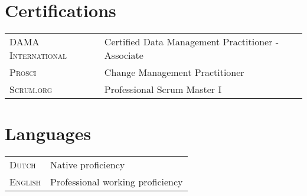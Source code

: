 \documentclass[a4paper,10pt]{article}
\begin{document}
\section{Certifications}
\begin{longtable}{R{3.4cm}|L{14.1cm}}
  \textsc{DAMA International}& Certified Data Management Practitioner - Associate\\
  \textsc{Prosci}& Change Management Practitioner\\  
  \textsc{Scrum.org}& Professional Scrum Master I\\
\end{longtable}

\section{Languages}
\begin{longtable}{R{3.4cm}|L{14.1cm}}
  \textsc{Dutch}& Native proficiency\\
  \textsc{English}& Professional working proficiency
\end{longtable}

\newpage
\end{document}
